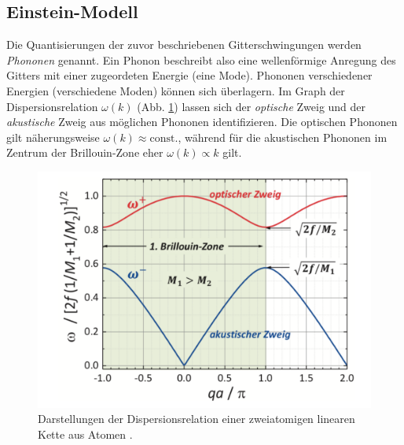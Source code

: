 \FloatBarrier
\subsection{Einstein-Modell}
Die Quantisierungen der zuvor beschriebenen Gitterschwingungen werden \textit{Phononen} genannt.
Ein Phonon beschreibt also eine wellenförmige Anregung des Gitters mit einer zugeordeten Energie (eine Mode).
Phononen verschiedener Energien (verschiedene Moden) können sich überlagern.
Im Graph der Dispersionsrelation $\omega(k)$ (Abb. \ref{fig:disp}) lassen sich der \textit{optische} Zweig und der \textit{akustische} Zweig aus möglichen Phononen identifizieren.
Die optischen Phononen gilt näherungsweise $\omega(k) \approx \text{const.}$, während für die akustischen Phononen im Zentrum der Brillouin-Zone eher $\omega(k) \propto k $ gilt.
\begin{figure}[!ht]
	\centering
	\includegraphics[width=\textwidth]{content/images/phononen.pdf}
    \caption{Darstellungen der Dispersionsrelation einer zweiatomigen linearen Kette aus Atomen \cite{grossmarx}.}
    \label{fig:disp}
\end{figure}

